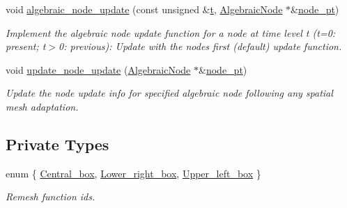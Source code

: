 \begin{DoxyCompactItemize}
void \hyperlink{classoomph_1_1AlgebraicRefineableQuarterCircleSectorMesh_ac591df8f18ad687e1dc9b70b731c2de1}{algebraic\+\_\+node\+\_\+update} (const unsigned \&\hyperlink{cfortran_8h_af6f0bd3dc13317f895c91323c25c2b8f}{t}, \hyperlink{classoomph_1_1AlgebraicNode}{Algebraic\+Node} $\ast$\&\hyperlink{classoomph_1_1AlgebraicMesh_aedeebbe95d2f8e67e9939cecd1be3933}{node\+\_\+pt})
\begin{DoxyCompactList}\small\item\em Implement the algebraic node update function for a node at time level t (t=0\+: present; t$>$0\+: previous)\+: Update with the node\textquotesingle{}s first (default) update function. \end{DoxyCompactList}\item 
void \hyperlink{classoomph_1_1AlgebraicRefineableQuarterCircleSectorMesh_a08abc1bf64e0637fc87c36638c41b846}{update\+\_\+node\+\_\+update} (\hyperlink{classoomph_1_1AlgebraicNode}{Algebraic\+Node} $\ast$\&\hyperlink{classoomph_1_1AlgebraicMesh_aedeebbe95d2f8e67e9939cecd1be3933}{node\+\_\+pt})
\begin{DoxyCompactList}\small\item\em Update the node update info for specified algebraic node following any spatial mesh adaptation. \end{DoxyCompactList}\end{DoxyCompactItemize}
\subsection*{Private Types}
\begin{DoxyCompactItemize}
\item 
enum \{ \hyperlink{classoomph_1_1AlgebraicRefineableQuarterCircleSectorMesh_ae985eaa6e1dda81c4e2ee092aab35151a070fa32a21fc9ed7e0ea2e4ee49bb226}{Central\+\_\+box}, 
\hyperlink{classoomph_1_1AlgebraicRefineableQuarterCircleSectorMesh_ae985eaa6e1dda81c4e2ee092aab35151a04eaf51389d87a087fa1e9b2b2bd0315}{Lower\+\_\+right\+\_\+box}, 
\hyperlink{classoomph_1_1AlgebraicRefineableQuarterCircleSectorMesh_ae985eaa6e1dda81c4e2ee092aab35151a5ff22a2cd960ec680a42f181d6cbdfb0}{Upper\+\_\+left\+\_\+box}
 \}\begin{DoxyCompactList}\small\item\em Remesh function ids. \end{DoxyCompactList}
\end{DoxyCompactItemize}
